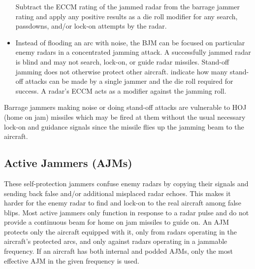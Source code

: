 \begin{advancedrules}
\begin{itemize}
    Subtract the ECCM rating of the jammed radar from the barrage jammer rating and apply any positive results as a die roll modifier for any search, passdowns, and/or lock-on attempts by the radar.

    \item {} Instead of flooding an arc with noise, the BJM can be focused on particular enemy radars in a concentrated jamming attack. A successfully jammed radar is blind and may not search, lock-on, or guide radar missiles. Stand-off jamming does not otherwise protect other aircraft.  indicate how many stand-off attacks can be made by a single jammer and the die roll required for success. A radar's ECCM acts as a modifier against the jamming roll.
    
\end{itemize}



Barrage jammers making noise or doing stand-off attacks are vulnerable to HOJ (home on jam) missiles which may be fired at them without the usual necessary lock-on and guidance signals since the missile flies up the jamming beam to the aircraft.


\subsection{Active Jammers (AJMs)}


These self-protection jammers confuse enemy radars by copying their signals and sending back false and/or additional misplaced radar echoes. This makes it harder for the enemy radar to find and lock-on to the real aircraft among false blips. Most active jammers only function in response to a radar pulse and do not provide a continuous beam for home on jam missiles to guide on. An AJM protects only the aircraft equipped with it, only from radars operating in the aircraft's protected arcs, and only against radars operating in a jammable frequency. If an aircraft has both internal and podded AJMs, only the most effective AJM in the given frequency is used.


\end{advancedrules}
